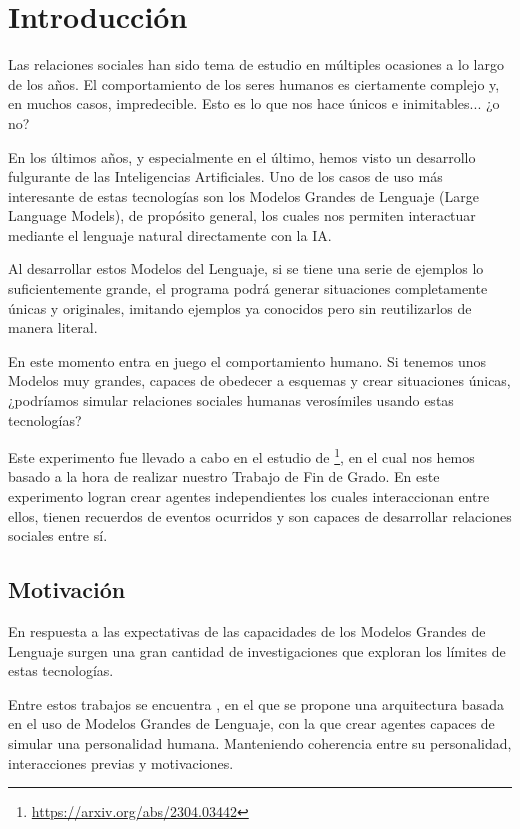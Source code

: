 \chapter{Introducción}
\label{cap:introduccion}


Las relaciones sociales han sido tema de estudio en múltiples ocasiones a lo largo de los años. El comportamiento de los seres humanos es ciertamente complejo y, en muchos casos, impredecible. Esto es lo que nos hace únicos e inimitables... ¿o no?

En los últimos años, y especialmente en el último, hemos visto un desarrollo fulgurante de las Inteligencias Artificiales. Uno de los casos de uso más interesante de estas tecnologías son los Modelos Grandes de Lenguaje (Large Language Models), de propósito general, los cuales nos permiten interactuar mediante el lenguaje natural directamente con la IA.

Al desarrollar estos Modelos del Lenguaje, si se tiene una serie de ejemplos lo suficientemente grande, el programa podrá generar situaciones completamente únicas y originales, imitando ejemplos ya conocidos pero sin reutilizarlos de manera literal.

En este momento entra en juego el comportamiento humano. Si tenemos unos Modelos muy grandes, capaces de obedecer a esquemas y crear situaciones únicas, ¿podríamos simular relaciones sociales humanas verosímiles usando estas tecnologías?

Este experimento fue llevado a cabo en el estudio de \ga\footnote{\url{https://arxiv.org/abs/2304.03442}}, en el cual nos hemos basado a la hora de realizar nuestro Trabajo de Fin de Grado. En este experimento logran crear agentes independientes los cuales interaccionan entre ellos, tienen recuerdos de eventos ocurridos y son capaces de desarrollar relaciones sociales entre sí.

\section{Motivación}
En respuesta a las expectativas de las capacidades de los Modelos Grandes de Lenguaje surgen una gran cantidad de investigaciones que exploran los límites de estas tecnologías.

Entre estos trabajos se encuentra \ga, en el que se propone una arquitectura basada en el uso de Modelos Grandes de Lenguaje, con la que crear agentes capaces de simular una personalidad humana. Manteniendo coherencia entre su personalidad, interacciones previas y motivaciones.

